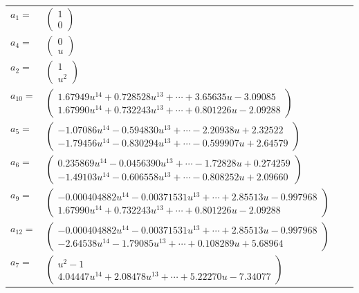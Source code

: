\documentclass[1p]{elsarticle_modified}
\theoremstyle{definition}
\begin{document}
\begin{tabular}{m{7pt} m{180pt} m{7pt} m{180pt} }
\flushright $a_{1}=$&$\begin{pmatrix}1\\0\end{pmatrix}$ \\
\flushright $a_{4}=$&$\begin{pmatrix}0\\u\end{pmatrix}$ \\
\flushright $a_{2}=$&$\begin{pmatrix}1\\u^2\end{pmatrix}$ \\
\flushright $a_{10}=$&$\begin{pmatrix}1.67949 u^{14}+0.728528 u^{13}+\cdots+3.65635 u-3.09085\\1.67990 u^{14}+0.732243 u^{13}+\cdots+0.801226 u-2.09288\end{pmatrix}$ \\
\flushright $a_{5}=$&$\begin{pmatrix}-1.07086 u^{14}-0.594830 u^{13}+\cdots-2.20938 u+2.32522\\-1.79456 u^{14}-0.830294 u^{13}+\cdots-0.599907 u+2.64579\end{pmatrix}$ \\
\flushright $a_{6}=$&$\begin{pmatrix}0.235869 u^{14}-0.0456390 u^{13}+\cdots-1.72828 u+0.274259\\-1.49103 u^{14}-0.606558 u^{13}+\cdots-0.808252 u+2.09660\end{pmatrix}$ \\
\flushright $a_{9}=$&$\begin{pmatrix}-0.000404882 u^{14}-0.00371531 u^{13}+\cdots+2.85513 u-0.997968\\1.67990 u^{14}+0.732243 u^{13}+\cdots+0.801226 u-2.09288\end{pmatrix}$ \\
\flushright $a_{12}=$&$\begin{pmatrix}-0.000404882 u^{14}-0.00371531 u^{13}+\cdots+2.85513 u-0.997968\\-2.64538 u^{14}-1.79085 u^{13}+\cdots+0.108289 u+5.68964\end{pmatrix}$ \\
\flushright $a_{7}=$&$\begin{pmatrix}u^2-1\\4.04447 u^{14}+2.08478 u^{13}+\cdots+5.22270 u-7.34077\end{pmatrix}$ \\

\end{tabular}
\end{document}
